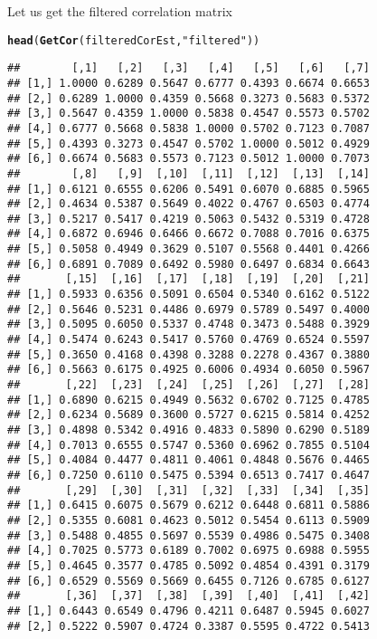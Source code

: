 \documentclass[12pt,letterpaper,english]{article}\usepackage[]{graphicx}\usepackage[]{color}
\makeatletter
\newcommand{\hlstr}[1]{\textcolor[rgb]{0.192,0.494,0.8}{#1}}%
\newcommand{\hlstd}[1]{\textcolor[rgb]{0.345,0.345,0.345}{#1}}%
\newcommand{\hlkwd}[1]{\textcolor[rgb]{0.737,0.353,0.396}{\textbf{#1}}}%
\newenvironment{kframe}{%
 \def\at@end@of@kframe{}%
 \ifinner\ifhmode%
  \def\at@end@of@kframe{\end{minipage}}%
  \begin{minipage}{\columnwidth}%
 \fi\fi%
 \def\FrameCommand##1{\hskip\@totalleftmargin \hskip-\fboxsep
 \colorbox{shadecolor}{##1}\hskip-\fboxsep
     \hskip-\linewidth \hskip-\@totalleftmargin \hskip\columnwidth}%
 \MakeFramed {\advance\hsize-\width
   \@totalleftmargin\z@ \linewidth\hsize
   \@setminipage}}%
 {\par\unskip\endMakeFramed%
 \at@end@of@kframe}
\newenvironment{knitrout}{}{} %
\makeatother
\begin{document}
Let us get the filtered correlation matrix
\begin{knitrout}
\color{fgcolor}\begin{kframe}
\begin{alltt}
\hlkwd{head}\hlstd{(}\hlkwd{GetCor}\hlstd{(filteredCorEst,} \hlstr{"filtered"}\hlstd{))}
\end{alltt}
\begin{verbatim}
##        [,1]   [,2]   [,3]   [,4]   [,5]   [,6]   [,7]
## [1,] 1.0000 0.6289 0.5647 0.6777 0.4393 0.6674 0.6653
## [2,] 0.6289 1.0000 0.4359 0.5668 0.3273 0.5683 0.5372
## [3,] 0.5647 0.4359 1.0000 0.5838 0.4547 0.5573 0.5702
## [4,] 0.6777 0.5668 0.5838 1.0000 0.5702 0.7123 0.7087
## [5,] 0.4393 0.3273 0.4547 0.5702 1.0000 0.5012 0.4929
## [6,] 0.6674 0.5683 0.5573 0.7123 0.5012 1.0000 0.7073
##        [,8]   [,9]  [,10]  [,11]  [,12]  [,13]  [,14]
## [1,] 0.6121 0.6555 0.6206 0.5491 0.6070 0.6885 0.5965
## [2,] 0.4634 0.5387 0.5649 0.4022 0.4767 0.6503 0.4774
## [3,] 0.5217 0.5417 0.4219 0.5063 0.5432 0.5319 0.4728
## [4,] 0.6872 0.6946 0.6466 0.6672 0.7088 0.7016 0.6375
## [5,] 0.5058 0.4949 0.3629 0.5107 0.5568 0.4401 0.4266
## [6,] 0.6891 0.7089 0.6492 0.5980 0.6497 0.6834 0.6643
##       [,15]  [,16]  [,17]  [,18]  [,19]  [,20]  [,21]
## [1,] 0.5933 0.6356 0.5091 0.6504 0.5340 0.6162 0.5122
## [2,] 0.5646 0.5231 0.4486 0.6979 0.5789 0.5497 0.4000
## [3,] 0.5095 0.6050 0.5337 0.4748 0.3473 0.5488 0.3929
## [4,] 0.5474 0.6243 0.5417 0.5760 0.4769 0.6524 0.5597
## [5,] 0.3650 0.4168 0.4398 0.3288 0.2278 0.4367 0.3880
## [6,] 0.5663 0.6175 0.4925 0.6006 0.4934 0.6050 0.5967
##       [,22]  [,23]  [,24]  [,25]  [,26]  [,27]  [,28]
## [1,] 0.6890 0.6215 0.4949 0.5632 0.6702 0.7125 0.4785
## [2,] 0.6234 0.5689 0.3600 0.5727 0.6215 0.5814 0.4252
## [3,] 0.4898 0.5342 0.4916 0.4833 0.5890 0.6290 0.5189
## [4,] 0.7013 0.6555 0.5747 0.5360 0.6962 0.7855 0.5104
## [5,] 0.4084 0.4477 0.4811 0.4061 0.4848 0.5676 0.4465
## [6,] 0.7250 0.6110 0.5475 0.5394 0.6513 0.7417 0.4647
##       [,29]  [,30]  [,31]  [,32]  [,33]  [,34]  [,35]
## [1,] 0.6415 0.6075 0.5679 0.6212 0.6448 0.6811 0.5886
## [2,] 0.5355 0.6081 0.4623 0.5012 0.5454 0.6113 0.5909
## [3,] 0.5488 0.4855 0.5697 0.5539 0.4986 0.5475 0.3408
## [4,] 0.7025 0.5773 0.6189 0.7002 0.6975 0.6988 0.5955
## [5,] 0.4645 0.3577 0.4785 0.5092 0.4854 0.4391 0.3179
## [6,] 0.6529 0.5569 0.5669 0.6455 0.7126 0.6785 0.6127
##       [,36]  [,37]  [,38]  [,39]  [,40]  [,41]  [,42]
## [1,] 0.6443 0.6549 0.4796 0.4211 0.6487 0.5945 0.6027
## [2,] 0.5222 0.5907 0.4724 0.3387 0.5595 0.4722 0.5413

\end{verbatim}
\end{kframe}
\end{knitrout}
\end{document}
